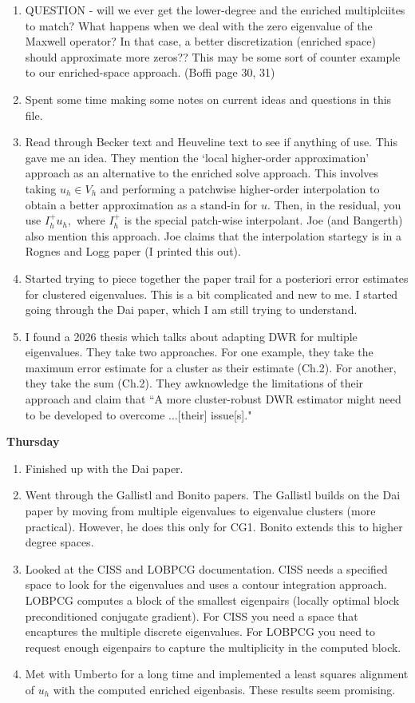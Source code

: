 \documentclass[12pt,a4paper]{article}
\begin{document}
\begin{enumerate}
    \item QUESTION - will we ever get the lower-degree and the enriched multiplciites to match? What happens when we deal with the zero eigenvalue of the Maxwell operator? In that case, a better discretization (enriched space) should approximate more zeros?? This may be some sort of counter example to our enriched-space approach. (Boffi page 30, 31)

    \item Spent some time making some notes on current ideas and questions in this file. 

    \item Read through Becker text and Heuveline text to see if anything of use. This gave me an idea. They mention the `local higher-order approximation' approach as an alternative to the enriched solve approach. This involves taking $u_h \in V_h$ and performing a patchwise higher-order interpolation to obtain a better approximation as a stand-in for $u.$ Then, in the residual, you use $I_h^+ u_h,$ where $I_h^+$ is the special patch-wise interpolant. Joe (and Bangerth) also mention this approach. Joe claims that the interpolation startegy is in a Rognes and Logg paper (I printed this out).

    \item Started trying to piece together the paper trail for a posteriori error estimates for clustered eigenvalues. This is a bit complicated and new to me. I started going through the Dai paper, which I am still trying to understand. 

    \item I found a 2026 thesis which talks about adapting DWR for multiple eigenvalues. They take two approaches. For one example, they take the maximum error estimate for a cluster as their estimate (Ch.2). For another, they take the sum (Ch.2). They awknowledge the limitations of their approach and claim that ``A more cluster-robust DWR estimator might need to be developed to overcome ...[their] issue[s]."
\end{enumerate}

\textbf{Thursday}
\begin{enumerate}
    \item Finished up with the Dai paper.
    \item Went through the Gallistl and Bonito papers. The Gallistl builds on the Dai paper by moving from multiple eigenvalues to eigenvalue clusters (more practical). However, he does this only for CG1. Bonito extends this to higher degree spaces.
    \item Looked at the CISS and LOBPCG documentation. CISS needs a specified space to look for the eigenvalues and uses a contour integration approach. LOBPCG computes a block of the smallest eigenpairs (locally optimal block preconditioned conjugate gradient). For CISS you need a space that encaptures the multiple discrete eigenvalues. For LOBPCG you need to request enough eigenpairs to capture the multiplicity in the computed block. 
    \item Met with Umberto for a long time and implemented a least squares alignment of $u_h$ with the computed enriched eigenbasis. These results seem promising.
\end{enumerate}
\end{document}
